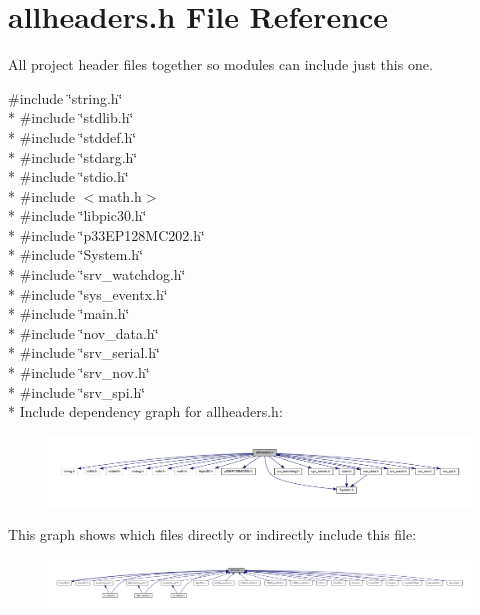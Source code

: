 \hypertarget{a00040}{\section{allheaders.\+h File Reference}
\label{a00040}
}


All project header files together so modules can include just this one.  


{\ttfamily \#include \char`\"{}string.\+h\char`\"{}}\\*
{\ttfamily \#include \char`\"{}stdlib.\+h\char`\"{}}\\*
{\ttfamily \#include \char`\"{}stddef.\+h\char`\"{}}\\*
{\ttfamily \#include \char`\"{}stdarg.\+h\char`\"{}}\\*
{\ttfamily \#include \char`\"{}stdio.\+h\char`\"{}}\\*
{\ttfamily \#include $<$math.\+h$>$}\\*
{\ttfamily \#include \char`\"{}libpic30.\+h\char`\"{}}\\*
{\ttfamily \#include \char`\"{}p33\+E\+P128\+M\+C202.\+h\char`\"{}}\\*
{\ttfamily \#include \char`\"{}System.\+h\char`\"{}}\\*
{\ttfamily \#include \char`\"{}srv\+\_\+watchdog.\+h\char`\"{}}\\*
{\ttfamily \#include \char`\"{}sys\+\_\+eventx.\+h\char`\"{}}\\*
{\ttfamily \#include \char`\"{}main.\+h\char`\"{}}\\*
{\ttfamily \#include \char`\"{}nov\+\_\+data.\+h\char`\"{}}\\*
{\ttfamily \#include \char`\"{}srv\+\_\+serial.\+h\char`\"{}}\\*
{\ttfamily \#include \char`\"{}srv\+\_\+nov.\+h\char`\"{}}\\*
{\ttfamily \#include \char`\"{}srv\+\_\+spi.\+h\char`\"{}}\\*
Include dependency graph for allheaders.\+h\+:\nopagebreak
\begin{figure}[H]
\begin{center}
\leavevmode
\includegraphics[width=350pt]{d8/d0a/a00904}
\end{center}
\end{figure}
This graph shows which files directly or indirectly include this file\+:\nopagebreak
\begin{figure}[H]
\begin{center}
\leavevmode
\includegraphics[width=350pt]{da/d5b/a00905}
\end{center}
\end{figure}

